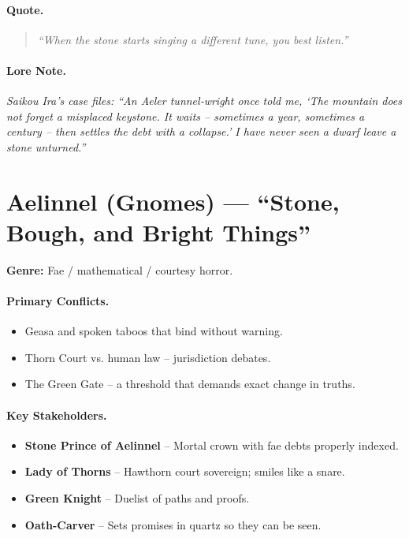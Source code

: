 \paragraph{Quote.}
\begin{quote}
\emph{“When the stone starts singing a different tune, you best listen.”}
\end{quote}

\paragraph{Lore Note.}
\emph{Saikou Ira’s case files: “An Aeler tunnel‑wright once told me, ‘The mountain does not forget a misplaced keystone. It waits – sometimes a year, sometimes a century – then settles the debt with a collapse.’ I have never seen a dwarf leave a stone unturned.”}

\section{Aelinnel (Gnomes) — “Stone, Bough, and Bright Things”}
\textbf{Genre:} Fae / mathematical / courtesy horror.

\paragraph{Primary Conflicts.}
\begin{itemize}
  \item Geasa and spoken taboos that bind without warning.
  \item Thorn Court vs. human law – jurisdiction debates.
  \item The Green Gate – a threshold that demands exact change in truths.
\end{itemize}

\paragraph{Key Stakeholders.}
\begin{itemize}
  \item \textbf{Stone Prince of Aelinnel} – Mortal crown with fae debts properly indexed.
  \item \textbf{Lady of Thorns} – Hawthorn court sovereign; smiles like a snare.
  \item \textbf{Green Knight} – Duelist of paths and proofs.
  \item \textbf{Oath-Carver} – Sets promises in quartz so they can be seen.
\end{itemize}

